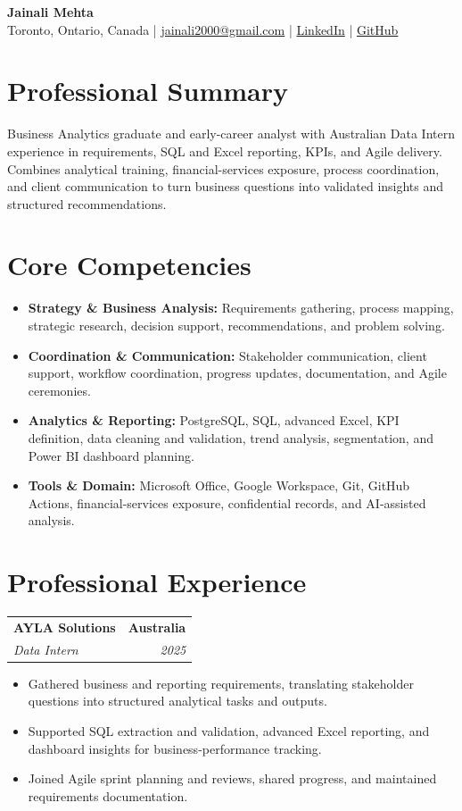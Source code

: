\documentclass[letterpaper,10pt]{article}
\makeatletter
\newcommand{\role}[4]{%
  \begin{tabularx}{\textwidth}{@{}Xr@{}}
    \textbf{#1} & \textbf{#2} \\
    \textit{#3} & \textit{#4}
  \end{tabularx}\vspace{-1pt}
}
\makeatother
\begin{document}
\begin{center}
  {\fontsize{17}{19}\selectfont\textbf{Jainali Mehta}}\\[2pt]
  \small Toronto, Ontario, Canada \;|\;
  \href{mailto:jainali2000@gmail.com}{jainali2000@gmail.com} \;|\;
  \href{https://www.linkedin.com/in/jainali-mehta}{LinkedIn} \;|\;
  \href{https://github.com/jainalimehta}{GitHub}
\end{center}
\vspace{-7pt}

\section{Professional Summary}
\small Business Analytics graduate and early-career analyst with Australian Data Intern experience in requirements, SQL and Excel reporting, KPIs, and Agile delivery. Combines analytical training, financial-services exposure, process coordination, and client communication to turn business questions into validated insights and structured recommendations.

\section{Core Competencies}
\begin{itemize}[leftmargin=0.16in,label=\textbullet,topsep=0pt,itemsep=1pt,parsep=0pt]
  \item \small \textbf{Strategy \& Business Analysis:} Requirements gathering, process mapping, strategic research, decision support, recommendations, and problem solving.
  \item \small \textbf{Coordination \& Communication:} Stakeholder communication, client support, workflow coordination, progress updates, documentation, and Agile ceremonies.
  \item \small \textbf{Analytics \& Reporting:} PostgreSQL, SQL, advanced Excel, KPI definition, data cleaning and validation, trend analysis, segmentation, and Power BI dashboard planning.
  \item \small \textbf{Tools \& Domain:} Microsoft Office, Google Workspace, Git, GitHub Actions, financial-services exposure, confidential records, and AI-assisted analysis.
\end{itemize}

\section{Professional Experience}
\role{AYLA Solutions}{Australia}{Data Intern}{2025}
\begin{itemize}
  \item Gathered business and reporting requirements, translating stakeholder questions into structured analytical tasks and outputs.
  \item Supported SQL extraction and validation, advanced Excel reporting, and dashboard insights for business-performance tracking.
  \item Joined Agile sprint planning and reviews, shared progress, and maintained requirements documentation.
\end{itemize}
\vspace{1pt}
\end{document}
